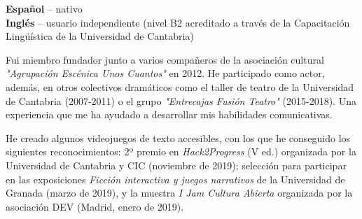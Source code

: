 \documentclass[9pt]{developercv} %
\begin{document}
\begin{minipage}[t]{0.3\textwidth}
	\vspace{-\baselineskip} %

	
	\textbf{Español} -- nativo\\
	\textbf{Inglés} -- usuario independiente (nivel B2 acreditado a través de la Capacitación Lingüística de la Universidad de Cantabria)\\
\end{minipage}
\hfill
\begin{minipage}[t]{0.3\textwidth}
	\vspace{-\baselineskip} %
	

	Fui miembro fundador junto a varios compañeros de la asociación cultural \emph{"Agrupación Escénica Unos Cuantos"} en 2012. He participado como actor, además, en otros colectivos dramáticos como el taller de teatro de la Universidad de Cantabria (2007-2011) o el grupo \emph{"Entrecajas Fusión Teatro"} (2015-2018). Una experiencia que me ha ayudado a desarrollar mis habilidades comunicativas.
\end{minipage}
\hfill
\begin{minipage}[t]{0.3\textwidth}
	\vspace{-\baselineskip} %
	

	He creado algunos videojuegos de texto accesibles, con los que he conseguido los siguientes reconocimientos: 2º premio en \emph{Hack2Progress} (V ed.) organizada por la Universidad de Cantabria y CIC (noviembre de 2019); selección para participar en las exposiciones \emph{Ficción interactiva y juegos narrativos} de la Universidad de Granada (marzo de 2019), y la muestra \emph{I Jam Cultura Abierta} organizada por la asociación DEV (Madrid, enero de 2019).
\end{minipage}
\end{document}
